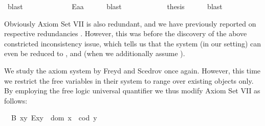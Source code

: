 \begin{isabellebody}
\ blast\ \isanewline
\ \ \ \ %
\ \isanewline
\ \ \ \isamarkupfalse%
\ {}{\isacharcolon}\ {\isachardoublequoteopen}E{\isacharparenleft}{\isacharparenleft}{\isasymbox}a{\isacharparenright}\isactrlbold {\isasymcdot}a{\isacharparenright}{\isachardoublequoteclose}\ \isamarkupfalse%
\ {}\ {}\ \isamarkupfalse%
\ blast\ \isanewline
\ \ \ \ %
\isanewline
\ \ \ \isamarkupfalse%
\ \isamarkupfalse%
\ {\isacharquery}thesis\ \isamarkupfalse%
\ {}\ {}\ \isamarkupfalse%
\ blast\isanewline
\ \ \isamarkupfalse%
%
\endisatagproof
{\isafoldproof}%
%
\isadelimproof
%
\endisadelimproof
%
\begin{isamarkuptext}%
Obviously Axiom Set VII is also redundant, and we have previously reported 
on respective redundancies \cite{C57}. However, this was before the discovery of the above 
constricted inconsistency issue, which tells us that the system (in our setting) can even be reduced 
to ,  and  (when we additionally assume ).%
\end{isamarkuptext}\isamarkuptrue%
%
\isamarkuptrue%
%
\begin{isamarkuptext}%
We study the axiom system by Freyd and Scedrov once again. However, this time we restrict 
the free variables in their system to range over existing objects only. By employing the free logic 
universal quantifier \isa{\isactrlbold {\isasymforall}} we thus modify Axiom Set VII as follows:%
\end{isamarkuptext}\isamarkuptrue%
\ \ B{}{\isacharcolon}\ {\isachardoublequoteopen}\isactrlbold {\isasymforall}x{\isachardot}\isactrlbold {\isasymforall}y{\isachardot}\ E{\isacharparenleft}x{\isasymcdot}y{\isacharparenright}\ \isactrlbold {\isasymleftrightarrow}\ dom\ x\ {\isasymcong}\ cod\ y{\isachardoublequoteclose}\ \isanewline

\end{isabellebody}
